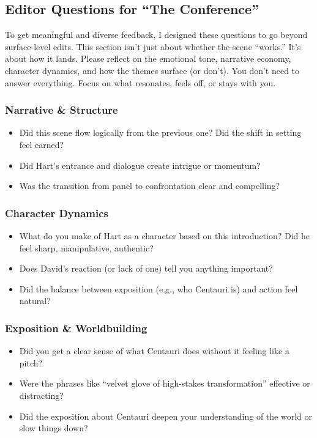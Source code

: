 \subsection{Editor Questions for ``The Conference''}

To get meaningful and diverse feedback, I designed these questions to go beyond surface-level edits.  
This section isn’t just about whether the scene “works.” It’s about how it lands. Please reflect on the 
emotional tone, narrative economy, character dynamics, and how the themes surface (or don’t). You don’t 
need to answer everything. Focus on what resonates, feels off, or stays with you.

\subsubsection{Narrative \& Structure}

\begin{itemize}
  \item Did this scene flow logically from the previous one? Did the shift in setting feel earned?
  \item Did Hart’s entrance and dialogue create intrigue or momentum?
  \item Was the transition from panel to confrontation clear and compelling?
\end{itemize}

\subsubsection{Character Dynamics}

\begin{itemize}
  \item What do you make of Hart as a character based on this introduction? Did he feel sharp, manipulative, authentic?
  \item Does David’s reaction (or lack of one) tell you anything important?
  \item Did the balance between exposition (e.g., who Centauri is) and action feel natural?
\end{itemize}

\subsubsection{Exposition \& Worldbuilding}

\begin{itemize}
  \item Did you get a clear sense of what Centauri does without it feeling like a pitch?
  \item Were the phrases like “velvet glove of high-stakes transformation” effective or distracting?
  \item Did the exposition about Centauri deepen your understanding of the world or slow things down?
\end{itemize}

